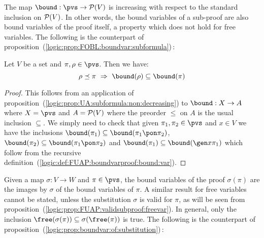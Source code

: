 The map $\bound:\pvs\to{\cal P}(V)$ is increasing with respect to
the standard inclusion on ${\cal P}(V)$. In other words, the bound
variables of a sub-proof are also bound variables of the proof
itself, a property which does not hold for free variables. The
following is the counterpart of
proposition~(\ref{logic:prop:FOBL:boundvar:subformula})\,:
\begin{prop}\label{logic:prop:FUAP:boundvarproof:subformula}
Let $V$ be a set and $\pi,\rho\in\pvs$. Then we have:
    \[
    \rho\preceq\pi\ \Rightarrow\ \bound(\rho)\subseteq\bound(\pi)
    \]
\end{prop}
\begin{proof}
This follows from an application of
proposition~(\ref{logic:prop:UA:subformula:non:decreasing}) to
$\bound:X\to A$ where $X=\pvs$ and $A={\cal P}(V)$ where the
preorder $\leq$ on $A$ is the usual inclusion $\subseteq$. We simply
need to check that given $\pi_{1},\pi_{2}\in\pvs$ and $x\in V$ we
have the inclusions
$\bound(\pi_{1})\subseteq\bound(\pi_{1}\pon\pi_{2})$,
$\bound(\pi_{2})\subseteq\bound(\pi_{1}\pon\pi_{2})$ and
$\bound(\pi_{1})\subseteq\bound(\gen x\pi_{1})$ which follow from
the recursive
definition~(\ref{logic:def:FUAP:boundvarproof:bound:var}).
\end{proof}

Given a map $\sigma:V\to W$ and $\pi\in\pvs$, the bound variables of
the proof $\sigma(\pi)$ are the images by $\sigma$ of the bound
variables of $\pi$. A similar result for free variables cannot be
stated, unless the substitution $\sigma$ is valid for $\pi$, as will
be seen from
proposition~(\ref{logic:prop:FUAP:validsubproof:freevar}). In
general, only the inclusion
$\free(\sigma(\pi))\subseteq\sigma(\free(\pi))$ is true. The
following is the counterpart of
proposition~(\ref{logic:prop:boundvar:of:substitution})\,:

